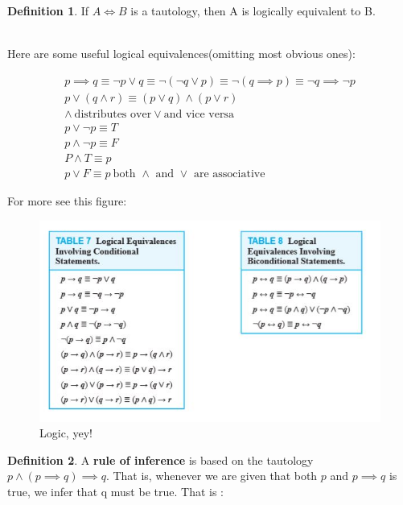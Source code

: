 \documentclass{article}
\theoremstyle{definition}
\newtheorem{definition}{Definition}
\begin{document}
\begin{definition}
If $A \iff B$ is a tautology, then A is logically equivalent to B. 
\end{definition}
\\

Here are some useful logical equivalences(omitting most obvious ones):

\begin{align*}
    p \implies q \equiv \neg p \lor q \equiv \neg(\neg q \lor p) \equiv \neg(q \implies p) \equiv \neg q \implies \neg p \\
    p \lor ( q \land r) \equiv (p \lor q) \land (p \lor r) \\
    \land \ \text{distributes over} \lor \text{and vice versa}\\
    p \lor \neg p \equiv T\\
    p \land \neg p \equiv F\\
    P \land T \equiv p\\
    p \lor F \equiv p
    \ \text{both $\land$ and $\lor$ are associative}
\end{align*}

For more see this figure:

\begin{figure}[h]
    \centering
    \includegraphics[scale = 0.7]{epflSemesterOne/advancedComputation/figures/logic.JPG}
    \caption{Logic, yey!}
    \label{fig:my_label}
\end{figure}

\begin{definition}
A \textbf{rule of inference} is based on the tautology $p \land (p \implies q) \implies q$. That is, whenever we are given that both $p$ and $p \implies q$ is true, we infer that q must be true. That is :
\\

\end{definition}
\end{document}
